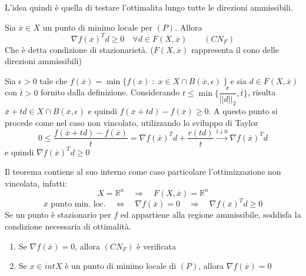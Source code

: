 L'idea quindi \`e quella di testare l'ottimalita lungo tutte
le direzioni ammissibili.

\begin{theo}
\label{ottvinc:01}
 Sia $\overline{x} \in X$  un punto di minimo locale per $(P)$.
Allora
$$ \nabla f(\overline{x})^{T} d \geq 0 \quad
\forall d \in F(X,\overline{x}) \qquad (CN_{F}) $$
Che \`e detta condizione di stazionariet\`a. ($F(X,\overline{x})$ rappresenta il cono delle direzioni ammissibili)
\end{theo}

\begin{thproof}
Sia $\epsilon > 0 $ tale che 
$f(\overline{x}) = \min \{ f(x) \; : \; x \in X \cap B(\overline{x}, \epsilon) \;\}$ e sia $ d \in F(X, \overline{x})$ con $\overline{t} > 0$
fornito dalla definizione. Considerando
$t \leq \min\{ \dfrac{\epsilon}{||d||_2}, \overline{t} \}$, risulta
$\overline{x} + td \in X \cap B(\overline{x}, \epsilon)$ e quindi
$f(\overline{x} + td) - f(\overline{x}) \geq 0$.
A questo punto si procede come nel caso non vincolato,
utilizzando lo sviluppo di Taylor
$$ 0 \leq
\dfrac{ f(\overline{x} + td) - f(\overline{x})}{t} = 
\nabla f(\overline{x})^{T}d + \dfrac{r(td)}{t} 
\xrightarrow{t \downarrow 0} \nabla f(\overline{x})^{T}d
$$
e quindi $\nabla f(\overline{x})^{T}d \geq 0$

\end{thproof}

Il teorema contiene al suo interno come caso particolare
l'ottimizzazione non vincolata, infatti:
$$ X = \mathbb{R}^{n} \quad \Rightarrow \quad
F(X,\overline{x}) = \mathbb{R}^{n}$$
$$ \overline{x} \text{ punto min. loc.} \quad \Leftrightarrow \quad \nabla f(\overline{x}) =0\quad \Rightarrow \quad \nabla f(\overline{x})^T d \geq 0
$$
Se un punto \`e stazionario per $f$ ed appartiene
alla regione ammissibile, soddisfa la condizione necessaria
di ottimalit\`a.

\begin{observation}
  \begin{enumerate}
  \item Se $\nabla f(\overline{x})=0$, allora $(CN_{F})$ \`e verificata
  \item Se $x \in intX$ \`e un punto di minimo locale di $(P)$, allora
    $\nabla f(\overline{x}) = 0$
  \end{enumerate}
\end{observation}

